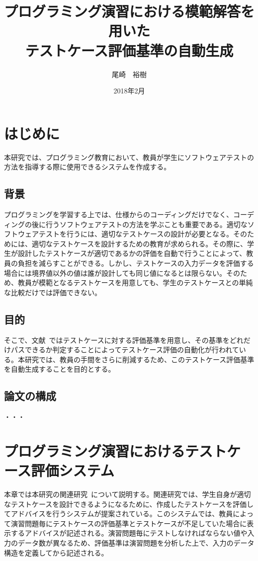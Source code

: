 \documentclass{tpu-sotu}
\author{尾崎　裕樹}
\title{プログラミング演習における模範解答を用いた\\テストケース評価基準の自動生成}
\date{2018年2月}
\begin{document}
%
\maketitle
\clearpage
{}
\tableofcontents
\clearpage
{}
%

%
\chapter{はじめに}
本研究では、プログラミング教育において、教員が学生にソフトウェアテストの方法を指導する際に使用できるシステムを作成する。
\section{背景}
プログラミングを学習する上では、仕様からのコーディングだけでなく、コーディングの後に行うソフトウェアテストの方法を学ぶことも重要である。適切なソフトウェアテストを行うには、適切なテストケースの設計が必要となる。そのためには、適切なテストケースを設計するための教育が求められる。その際に、学生が設計したテストケースが適切であるかの評価を自動で行うことによって、教員の負担を減らすことができる。しかし、テストケースの入力データを評価する場合には境界値以外の値は誰が設計しても同じ値になるとは限らない。そのため、教員が模範となるテストケースを用意しても、学生のテストケースとの単純な比較だけでは評価できない。
\section{目的}
そこで、文献~\cite{a1}ではテストケースに対する評価基準を用意し、その基準をどれだけパスできるか判定することによってテストケース評価の自動化が行われている。本研究では、教員の手間をさらに削減するため、このテストケース評価基準を自動生成することを目的とする。
\section{論文の構成}
  ・・・
\chapter{プログラミング演習におけるテストケース評価システム}
本章では本研究の関連研究~\cite{a1}について説明する。関連研究では、学生自身が適切なテストケースを設計できるようになるために、作成したテストケースを評価してアドバイスを行うシステムが提案されている。このシステムでは、教員によって演習問題毎にテストケースの評価基準とテストケースが不足していた場合に表示するアドバイスが記述される。演習問題毎にテストしなければならない値や入力のデータ数が異なるため、評価基準は演習問題を分析した上で、入力のデータ構造を定義してから記述される。
\end{document}
